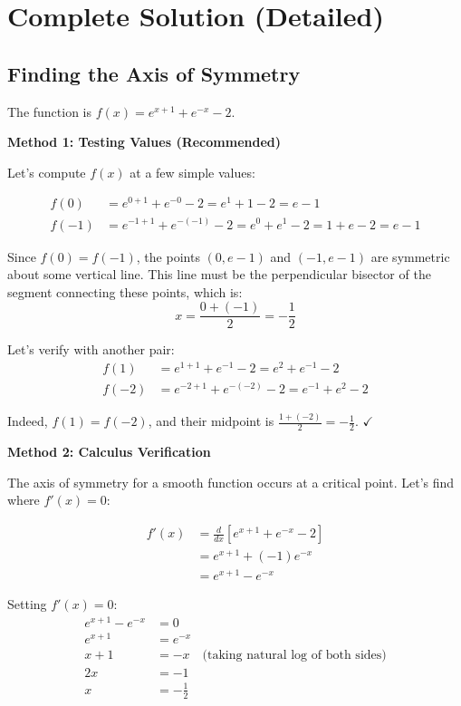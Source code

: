 \documentclass[12pt]{article}
\begin{document}
\section*{Complete Solution (Detailed)}

\subsection*{Finding the Axis of Symmetry}

The function is $f(x) = e^{x+1} + e^{-x} - 2$.

\textbf{Method 1: Testing Values (Recommended)}

Let's compute $f(x)$ at a few simple values:

\begin{align*}
f(0) &= e^{0+1} + e^{-0} - 2 = e^1 + 1 - 2 = e - 1\\
f(-1) &= e^{-1+1} + e^{-(-1)} - 2 = e^0 + e^1 - 2 = 1 + e - 2 = e - 1
\end{align*}

Since $f(0) = f(-1)$, the points $(0, e-1)$ and $(-1, e-1)$ are symmetric about some vertical line. This line must be the perpendicular bisector of the segment connecting these points, which is:
$$x = \frac{0 + (-1)}{2} = -\frac{1}{2}$$

Let's verify with another pair:
\begin{align*}
f(1) &= e^{1+1} + e^{-1} - 2 = e^2 + e^{-1} - 2\\
f(-2) &= e^{-2+1} + e^{-(-2)} - 2 = e^{-1} + e^2 - 2
\end{align*}

Indeed, $f(1) = f(-2)$, and their midpoint is $\frac{1 + (-2)}{2} = -\frac{1}{2}$. $\checkmark$

\textbf{Method 2: Calculus Verification}

The axis of symmetry for a smooth function occurs at a critical point. Let's find where $f'(x) = 0$:

\begin{align*}
f'(x) &= \frac{d}{dx}\left[e^{x+1} + e^{-x} - 2\right]\\
&= e^{x+1} + (-1)e^{-x}\\
&= e^{x+1} - e^{-x}
\end{align*}

Setting $f'(x) = 0$:
\begin{align*}
e^{x+1} - e^{-x} &= 0\\
e^{x+1} &= e^{-x}\\
x + 1 &= -x \quad \text{(taking natural log of both sides)}\\
2x &= -1\\
x &= -\frac{1}{2}
\end{align*}
\end{document}
